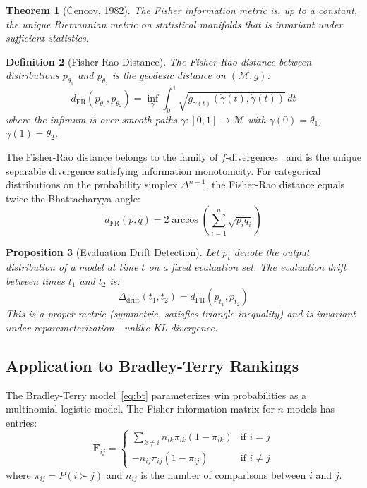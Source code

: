 \documentclass[11pt]{article}
\newtheorem{theorem}{Theorem}[section]
\newtheorem{definition}[theorem]{Definition}
\newtheorem{proposition}[theorem]{Proposition}
\newcommand{\cM}{\mathcal{M}}
\newcommand{\FR}{d_{\mathrm{FR}}}
\newcommand{\Fish}{\mathbf{F}}
\begin{document}
\begin{theorem}[\v{C}encov, 1982]
The Fisher information metric is, up to a constant, the unique Riemannian metric on statistical manifolds that is invariant under sufficient statistics.
\end{theorem}

\begin{definition}[Fisher-Rao Distance]
The \emph{Fisher-Rao distance} between distributions $p_{\theta_1}$ and $p_{\theta_2}$ is the geodesic distance on $(\cM, g)$:
\begin{equation}
\FR(p_{\theta_1}, p_{\theta_2}) = \inf_{\gamma} \int_0^1 \sqrt{g_{\gamma(t)}(\dot{\gamma}(t), \dot{\gamma}(t))} \, dt
\end{equation}
where the infimum is over smooth paths $\gamma: [0,1] \to \cM$ with $\gamma(0) = \theta_1$, $\gamma(1) = \theta_2$.
\end{definition}

The Fisher-Rao distance belongs to the family of $f$-divergences~\cite{burbea1986differential} and is the unique separable divergence satisfying information monotonicity. For categorical distributions on the probability simplex $\Delta^{n-1}$, the Fisher-Rao distance equals twice the Bhattacharyya angle:
\begin{equation}
\FR(p, q) = 2 \arccos\left(\sum_{i=1}^n \sqrt{p_i q_i}\right)
\label{eq:fr_categorical}
\end{equation}

\begin{proposition}[Evaluation Drift Detection]
Let $p_t$ denote the output distribution of a model at time $t$ on a fixed evaluation set. The evaluation drift between times $t_1$ and $t_2$ is:
\begin{equation}
\Delta_{\text{drift}}(t_1, t_2) = \FR(p_{t_1}, p_{t_2})
\end{equation}
This is a proper metric (symmetric, satisfies triangle inequality) and is invariant under reparameterization---unlike KL divergence.
\end{proposition}

\subsection{Application to Bradley-Terry Rankings}

The Bradley-Terry model~\eqref{eq:bt} parameterizes win probabilities as a multinomial logistic model. The Fisher information matrix for $n$ models has entries:
\begin{equation}
\Fish_{ij} = \begin{cases}
\sum_{k \neq i} n_{ik} \pi_{ik}(1 - \pi_{ik}) & \text{if } i = j \\
-n_{ij} \pi_{ij}(1 - \pi_{ij}) & \text{if } i \neq j
\end{cases}
\end{equation}
where $\pi_{ij} = P(i \succ j)$ and $n_{ij}$ is the number of comparisons between $i$ and $j$.
\end{document}
